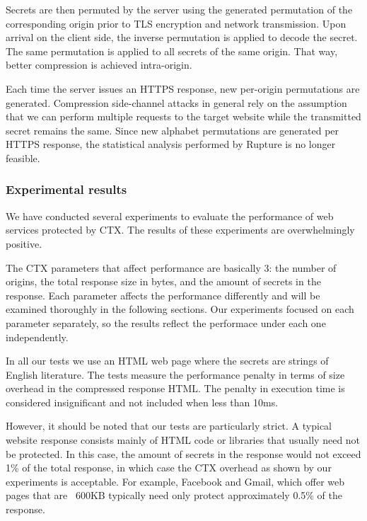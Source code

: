 \documentclass[conference, letterpaper, 10pt]{IEEEtran}
\begin{document}
Secrets are then permuted by the server using the generated permutation of the
corresponding origin prior to TLS encryption and network transmission. Upon
arrival on the client side, the inverse permutation is applied to decode the
secret. The same permutation is applied to all secrets of the same origin. That
way, better compression is achieved intra-origin.

Each time the server issues an HTTPS response, new per-origin permutations are
generated. Compression side-channel attacks in general rely on the assumption that we can
perform multiple requests to the target website while the transmitted secret
remains the same. Since new alphabet permutations are generated per HTTPS
response, the statistical analysis performed by Rupture is no longer feasible.

\subsubsection{Experimental results}\label{subsubsec:ctx_experiments}

We have conducted several experiments to evaluate the performance of web
services protected by CTX. The results of these experiments are overwhelmingly
positive.

The CTX parameters that affect performance are basically 3: the number of
origins, the total response size in bytes, and the amount of
secrets in the response. Each parameter affects the performance differently and
will be examined thoroughly in the following sections. Our experiments focused
on each parameter separately, so the results reflect the performace under each
one independently.

In all our tests we use an HTML web page where the secrets are strings of
English literature. The tests measure the performance penalty in terms of size
overhead in the compressed response HTML. The penalty in execution time is
considered insignificant and not included when less than 10ms.

However, it should be noted that our tests are particularly strict. A typical
website response consists mainly of HTML code or libraries that usually need not
be protected. In this case, the amount of secrets in the response would not
exceed 1\% of the total response, in which case the CTX overhead as shown by our
experiments is acceptable. For example, Facebook and Gmail, which offer web
pages that are ~600KB typically need only protect approximately 0.5\% of the
response.
\end{document}
